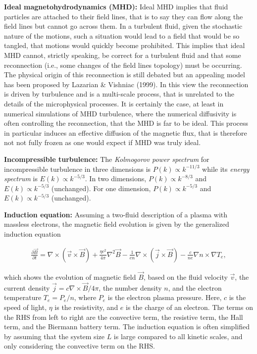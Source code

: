 \documentclass[a4paper,10pt]{article}
\begin{document}
{\noindent}\textbf{Ideal magnetohydrodynamics (MHD):} Ideal MHD implies that fluid particles are attached to their field lines, that is to say they can flow along the field lines but cannot go across them. In a turbulent fluid, given the stochastic nature of the motions, such a situation would lead to a field that would be so tangled, that motions would quickly become prohibited. This implies that ideal MHD cannot, strictly speaking, be correct for a turbulent fluid and that some reconnection (i.e., some changes of the field lines topology) must be occurring. The physical origin of this reconnection is still debated but an appealing model has been proposed by Lazarian \& Vishniac (1999). In this view the reconnection is driven by turbulence and is a multi-scale process, that is unrelated to the details of the microphysical processes. It is certainly the case, at least in numerical simulations of MHD turbulence, where the numerical diffusivity is often controlling the reconnection, that the MHD is far to be ideal. This process in particular induces an effective diffusion of the magnetic flux, that is therefore not not fully frozen as one would expect if MHD was truly ideal.

{\noindent}\textbf{Incompressible turbulence:} The \textit{Kolmogorov power spectrum} for incompressible turbulence in three dimensions is $P(k)\propto k^{-11/3}$ while its \textit{energy spectrum} is $E(k)\propto k^{-5/3}$. In two dimensions, $P(k)\propto k^{-8/3}$ and $E(k)\propto k^{-5/3}$ (unchanged). For one dimension, $P(k)\propto k^{-5/3}$ and $E(k)\propto k^{-5/3}$ (unchanged).

{\noindent}\textbf{Induction equation:} Assuming a two-fluid description of a plasma with massless electrons, the magnetic field evolution is given by the generalized induction equation

\begin{align*}
    \frac{\partial\vec{B}}{\partial t} = \nabla\times(\vec{v}\times\vec{B}) + \frac{\eta c^2}{4\pi}\nabla^2\vec{B} - \frac{1}{en}\nabla\times(\vec{j}\times\vec{B}) - \frac{c}{ne}\nabla n\times\nabla T_e,
\end{align*}

{\noindent}which shows the evolution of magnetic field $\vec{B}$, based on the fluid velocity $\vec{v}$, the current density $\vec{j}=c\nabla\times\vec{B}/4\pi$, the number density $n$, and the electron temperature $T_e=P_e/n$, where $P_e$ is the electron plasma pressure. Here, $c$ is the speed of light, $\eta$ is the resistivity, and $e$ is the charge of an electron. The terms on the RHS from left to right are the convective term, the resistive term, the Hall term, and the Biermann battery term. The induction equation is often simplified by assuming that the system size $L$ is large compared to all kinetic scales, and only considering the convective term on the RHS. 
\end{document}
